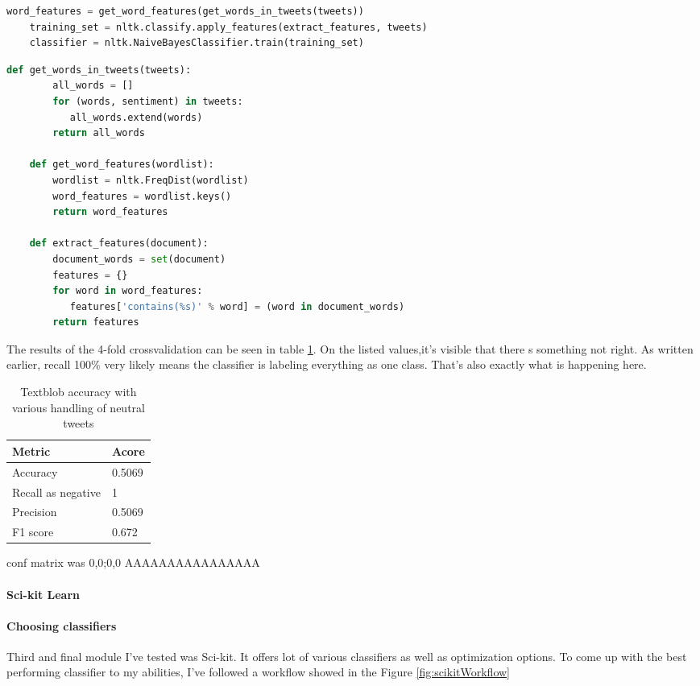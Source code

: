 \begin{lstlisting}[caption={Feature extraction and NLT classifier training},label={lst:nltTrainingCode},language=Python]
    word_features = get_word_features(get_words_in_tweets(tweets))
    training_set = nltk.classify.apply_features(extract_features, tweets)
    classifier = nltk.NaiveBayesClassifier.train(training_set)
\end{lstlisting}    
\begin{lstlisting}[caption={Helper methods for text features extraction},label={lst:nltTrainingCodeHelperMethods},language=Python]
    def get_words_in_tweets(tweets):
    	all_words = []
    	for (words, sentiment) in tweets:
           all_words.extend(words)
    	return all_words    
    
    def get_word_features(wordlist):
    	wordlist = nltk.FreqDist(wordlist)
    	word_features = wordlist.keys()
    	return word_features

    def extract_features(document):
    	document_words = set(document)
    	features = {}
    	for word in word_features:
           features['contains(%s)' % word] = (word in document_words)
    	return features
\end{lstlisting}

The results of the 4-fold crossvalidation can be seen in table \ref{table:NLTmetrics}. On the listed values,it's visible that there
s something not right. As written earlier, recall 100\% very likely means the classifier is labeling everything as one class. That's also exactly what is happening here.

\begin{table}[H]
\centering
\begin{tabular}{ |p{3cm}|p{3cm}|}
 \hline
\textbf{ Metric }& \textbf{Acore}\\
 \hline
 Accuracy   & 0.5069\\ \hline
 Recall as negative & 1\\ \hline
 Precision & 0.5069\\ \hline 
 F1 score & 0.672\\ \hline 
\end{tabular}
\caption{Textblob accuracy with various handling of neutral tweets}
\label{table:NLTmetrics}
\end{table}

conf matrix was 0,0;0,0
AAAAAAAAAAAAAAAA

\paragraph{Sci-kit Learn}\paragraph{Choosing classifiers}
Third and final module I've tested was Sci-kit. It offers lot of various classifiers as well as optimization options. To come up with the best performing classifier to my abilities, I've followed a workflow showed in the Figure \ref{fig:scikitWorkflow}


